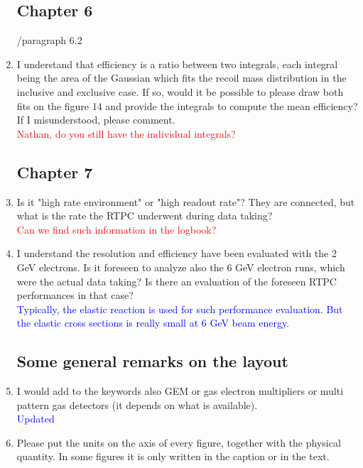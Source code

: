 \documentclass[a4paper,11pt,twoside]{article}
\begin{document}
\begin{enumerate}
\subsection*{ Chapter 6}

        /paragraph 6.2
\item I understand that efficiency is a ratio between two integrals, each 
   integral being the area of the Gaussian which fits the recoil mass 
   distribution in the inclusive and exclusive case. If so, would it be 
   possible to please draw both fits on the figure 14 and provide the integrals 
   to compute the mean efficiency? If I misunderstood, please comment.\\
\textcolor{red}{Nathan, do you still have the individual integrals? } 

\subsection*{ Chapter 7} 

\item Is it "high rate environment" or "high readout rate"? They are connected, 
   but what is the rate the RTPC underwent during data taking?\\
\textcolor{red}{Can we find such information in the logbook?} 

\item I understand the resolution and efficiency have been evaluated with the 2 
   GeV electrons. Is it foreseen to analyze also the 6 GeV electron runs, which 
   were the actual data taking? Is there an evaluation of the foreseen RTPC 
   performances in that case?\\
\textcolor{blue}{Typically, the elastic reaction is used for such performance 
evaluation. But the elastic cross sections is really small at 6 GeV beam 
energy.} 

\subsection*{ Some general remarks on the layout}

\item I would add to the keywords also GEM or gas electron multipliers or multi 
   pattern gas detectors (it depends on what is available).\\
\textcolor{blue}{Updated} 

\item Please put the units on the axis of every figure, together with the 
   physical quantity. In some figures it is only written in the caption or in 
   the text.\\
\textcolor{blue}{ } 


\end{enumerate}
\end{document}
